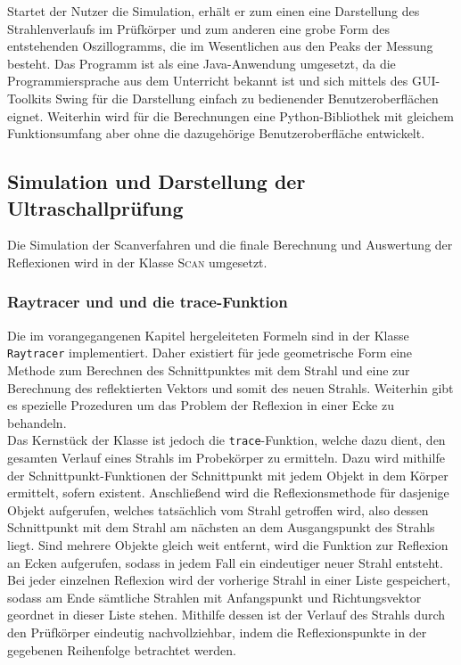 \documentclass[reducespace,stylepage,semiarbeit]{spezidoc}
\begin{document}
Startet der Nutzer die Simulation, erhält er zum einen eine Darstellung des Strahlenverlaufs im Prüfkörper und zum anderen eine grobe Form des entstehenden Oszillogramms, die im Wesentlichen aus den Peaks der Messung besteht.
Das Programm ist als eine Java-Anwendung umgesetzt, da die Programmiersprache aus dem Unterricht bekannt ist und sich mittels des GUI-Toolkits Swing für die Darstellung einfach zu bedienender Benutzeroberflächen eignet.
Weiterhin wird für die Berechnungen eine Python-Bibliothek mit gleichem Funktionsumfang aber ohne die dazugehörige Benutzeroberfläche entwickelt.


\subsection{Simulation und Darstellung der Ultraschallprüfung}
Die Simulation der Scanverfahren und die finale Berechnung und Auswertung der Reflexionen wird in der Klasse \textsc{Scan} umgesetzt. %

\subsubsection{Raytracer und und die trace-Funktion}
Die im vorangegangenen Kapitel hergeleiteten Formeln sind in der Klasse \texttt{Raytracer} implementiert. Daher existiert für jede geometrische Form eine Methode zum Berechnen des Schnittpunktes mit dem Strahl und eine zur Berechnung des reflektierten Vektors und somit des neuen Strahls. Weiterhin gibt es spezielle Prozeduren um das Problem der Reflexion in einer Ecke zu behandeln.\\
Das Kernstück der Klasse ist jedoch die \texttt{trace}-Funktion, welche dazu dient, den gesamten Verlauf eines Strahls im Probekörper zu ermitteln. Dazu wird mithilfe der Schnittpunkt-Funktionen der Schnittpunkt mit jedem Objekt in dem Körper ermittelt, sofern existent. Anschließend wird die Reflexionsmethode für dasjenige Objekt aufgerufen, welches tatsächlich vom Strahl getroffen wird, also dessen Schnittpunkt mit dem Strahl am nächsten an dem Ausgangspunkt des Strahls liegt. Sind mehrere Objekte gleich weit entfernt, wird die Funktion zur Reflexion an Ecken aufgerufen, sodass in jedem Fall ein eindeutiger neuer Strahl entsteht.\\
Bei jeder einzelnen Reflexion wird der vorherige Strahl in einer Liste gespeichert, sodass am Ende sämtliche Strahlen mit Anfangspunkt und Richtungsvektor geordnet in dieser Liste stehen. Mithilfe dessen ist der Verlauf des Strahls durch den Prüfkörper eindeutig nachvollziehbar, indem die Reflexionspunkte in der gegebenen Reihenfolge betrachtet werden.
\end{document}
